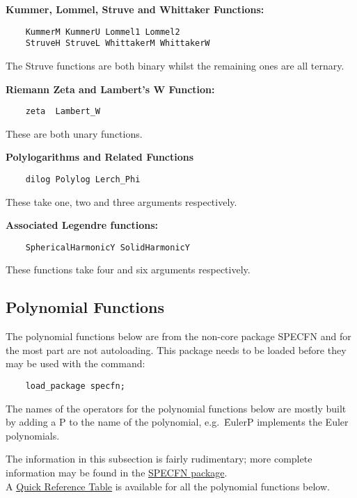 \textbf{Kummer, Lommel, Struve and Whittaker Functions:}
\begin{verbatim}
    KummerM KummerU Lommel1 Lommel2
    StruveH StruveL WhittakerM WhittakerW
\end{verbatim}
The Struve functions are both binary whilst the remaining ones are all ternary.

 
\textbf{Riemann Zeta and Lambert's W Function:}
\begin{verbatim}
    zeta  Lambert_W
\end{verbatim}
These are both unary functions.

 
\textbf{Polylogarithms and Related Functions}
\nopagebreak
\begin{verbatim}
    dilog Polylog Lerch_Phi
\end{verbatim}
These take one, two and three arguments respectively.

\textbf{Associated Legendre functions:}
\begin{verbatim}
    SphericalHarmonicY SolidHarmonicY
\end{verbatim}
These functions take four and six arguments respectively.

\subsection{Polynomial Functions}
The polynomial functions below are from the non-core package SPECFN
and for the most part are not autoloading. This package needs to be loaded
before they may be used with the command:
\begin{verbatim}
    load_package specfn;
\end{verbatim}
The names of the {\REDUCE} operators for the polynomial functions below
are mostly built by adding a P to the name of the polynomial,
e.g.\ \f{EulerP} implements the Euler polynomials.

The information in this subsection is fairly rudimentary; more complete
information may be found in the \hyperlink{POLYFN}{SPECFN package}.\\
A \hyperlink{SPECFNTAB3}{Quick Reference Table} is available for all the
polynomial functions below.

